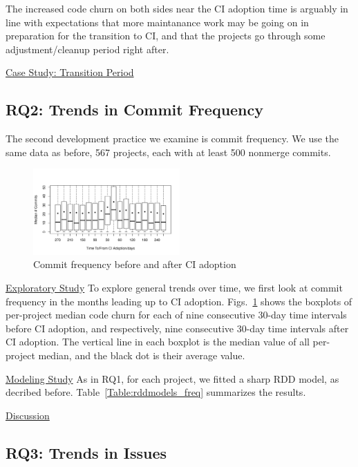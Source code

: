 \documentclass[conference]{IEEEtran}
\begin{document}
The increased code churn on both sides near the CI adoption time is arguably in line with expectations that more maintanance work may be going on in preparation for the transition to CI, and that the projects go through some adjustment/cleanup period right after.

\noindent \underline{Case Study: Transition Period}


\subsection{RQ2: Trends in Commit Frequency}

The second development practice we examine is commit frequency.
We use the same data as before, 567 projects, each with at least 500 nonmerge commits.

\begin{figure}[!t]
\centering
\includegraphics[width=0.5\textwidth]{numbercommits.pdf}
\caption{Commit frequency before and after CI adoption}
\label{Fig:NumberCommits}
\end{figure}

\noindent \underline{Exploratory Study} To explore general trends over time, we first look at commit frequency in the months leading up to CI adoption.
Figs.~\ref{Fig:NumberCommits} shows the boxplots of per-project median code churn for each of nine consecutive 30-day time intervals before CI adoption, and respectively, nine consecutive 30-day time intervals after CI adoption.
The vertical line in each boxplot is the median value of all per-project median, and the black dot is their average value.


\noindent \underline{Modeling Study} 
As in RQ1, for each project, we fitted a sharp RDD model, as decribed before.
Table~\ref{Table:rddmodels_freq} summarizes the results.




\noindent \underline{Discussion}




\subsection{RQ3: Trends in Issues}
\end{document}
